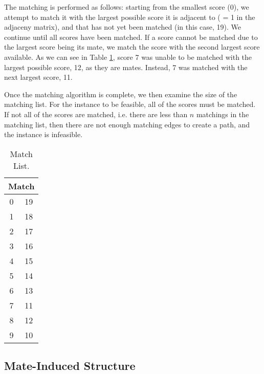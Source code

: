 \documentclass[a4paper, 11pt, twoside, onecolumn, openany]{article}
\begin{document}
The matching is performed as follows: starting from the smallest score (0), we attempt to match it with the largest possible score it is adjacent to ( = 1 in the adjaceny matrix), and that has not yet been matched (in this case, 19). We continue until all scores have been matched. If a score cannot be matched due to the largest score being its mate, we match the score with the second largest score available. As we can see in Table \ref{table:match}, score 7 was unable to be matched with the largest possible score, 12, as they are mates. Instead, 7 was matched with the next largest score, 11.

Once the matching algorithm is complete, we then examine the size of the matching list. For the instance to be feasible, all of the scores must be matched. If not all of the scores are matched, i.e. there are less than $n$ matchings in the matching list, then there are not enough matching edges to create a path, and the instance is infeasible. 

\begin{table}[htb]
	\centering
	\begin{tabular}{|c|c|}
		\hline
		\multicolumn{2}{|c|}{Match}\\ \hline
		0 & 19 \\ \hline
		1 & 18 \\ \hline
		2 & 17 \\ \hline
		3 & 16 \\ \hline
		4 & 15 \\ \hline
		5 & 14 \\ \hline
		6 & 13 \\ \hline
		7 & 11 \\ \hline
		8 & 12 \\ \hline
		9 & 10 \\
		\hline
	\end{tabular}
	\caption{Match List.}
	\label{table:match}
\end{table}	

\subsection{Mate-Induced Structure}
\end{document}
